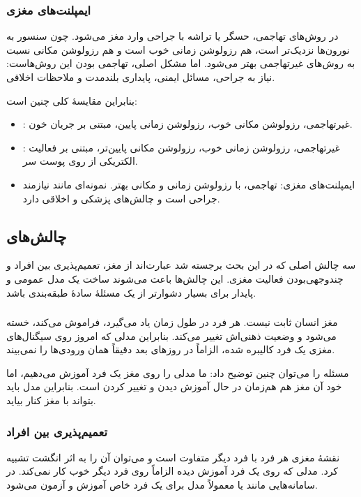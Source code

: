 \subsubsection{ایمپلنت‌های مغزی}
در روش‌های تهاجمی، حسگر یا تراشه با جراحی وارد مغز می‌شود. چون سنسور به نورون‌ها نزدیک‌تر است، هم رزولوشن زمانی خوب است و هم رزولوشن مکانی نسبت به روش‌های غیرتهاجمی بهتر می‌شود. اما مشکل اصلی، تهاجمی بودن این روش‌هاست: نیاز به جراحی، مسائل ایمنی، پایداری بلندمدت و ملاحظات اخلاقی.

بنابراین مقایسهٔ کلی چنین است:

\begin{itemize}
  \item {}: غیرتهاجمی، رزولوشن مکانی خوب، رزولوشن زمانی پایین، مبتنی بر جریان خون.
  \item {}: غیرتهاجمی، رزولوشن زمانی خوب، رزولوشن مکانی پایین‌تر، مبتنی بر فعالیت الکتریکی از روی پوست سر.
  \item ایمپلنت‌های مغزی: تهاجمی، با رزولوشن زمانی و مکانی بهتر. نمونه‌ای مانند  نیازمند جراحی است و چالش‌های پزشکی و اخلاقی دارد.
\end{itemize}

\subsection{چالش‌های }
سه چالش اصلی که در این بحث برجسته شد عبارت‌اند از  مغز، تعمیم‌پذیری بین افراد و چندوجهی‌بودن فعالیت مغزی. این چالش‌ها باعث می‌شوند ساخت یک مدل عمومی و پایدار برای  بسیار دشوارتر از یک مسئلهٔ سادهٔ طبقه‌بندی باشد.

\subsubsection{}
مغز انسان ثابت نیست. هر فرد در طول زمان یاد می‌گیرد، فراموش می‌کند، خسته می‌شود و وضعیت ذهنی‌اش تغییر می‌کند. بنابراین مدلی که امروز روی سیگنال‌های مغزی یک فرد کالیبره شده، الزاماً در روزهای بعد دقیقاً همان ورودی‌ها را نمی‌بیند.

مسئله را می‌توان چنین توضیح داد: ما مدلی را روی مغز یک فرد آموزش می‌دهیم، اما خود آن مغز هم هم‌زمان در حال آموزش دیدن و تغییر کردن است. بنابراین مدل باید بتواند با  مغز کنار بیاید.

\subsubsection{تعمیم‌پذیری بین افراد}
نقشهٔ مغزی هر فرد با فرد دیگر متفاوت است و می‌توان آن را به اثر انگشت تشبیه کرد. مدلی که روی یک فرد آموزش دیده الزاماً روی فرد دیگر خوب کار نمی‌کند. در سامانه‌هایی مانند  یا  معمولاً مدل برای یک فرد خاص آموزش و آزمون می‌شود.

